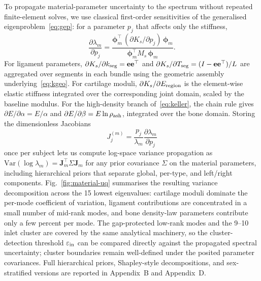 \documentclass[11pt]{article}
\begin{document}
To propagate material-parameter uncertainty to the spectrum without repeated finite-element solves, we use classical first-order sensitivities of the generalised eigenproblem~\eqref{eq:gep}: for a parameter $p_j$ that affects only the stiffness,
\begin{equation}
\frac{\partial\lambda_m}{\partial p_j}
=\frac{\boldsymbol\phi_m^\top\,(\partial K_s/\partial p_j)\,\boldsymbol\phi_m}
{\boldsymbol\phi_m^\top M_s\,\boldsymbol\phi_m}.
\label{eq:ev-sensitivity}
\end{equation}
For ligament parameters, $\partial K_s/\partial k_{\rm seg}=\mathbf e\mathbf e^\top$ and $\partial K_s/\partial T_{\rm seg}=(I-\mathbf e\mathbf e^\top)/L$ are aggregated over segments in each bundle using the geometric assembly underlying~\eqref{eq:kgeo}.
For cartilage moduli, $\partial K_s/\partial E_{\rm region}$ is the element-wise elastic stiffness integrated over the corresponding joint domain, scaled by the baseline modulus.
For the high-density branch of~\eqref{eq:keller}, the chain rule gives $\partial E/\partial\alpha=E/\alpha$ and $\partial E/\partial\beta=E\ln\rho_{\rm ash}$, integrated over the bone domain.
Storing the dimensionless Jacobians
\begin{equation}
J_j^{(m)}=\frac{p_j}{\lambda_m}\frac{\partial\lambda_m}{\partial p_j}
\end{equation}
once per subject lets us compute log-space variance propagation as $\mathrm{Var}(\log\lambda_m)=\mathbf J_m^\top\Sigma\mathbf J_m$ for any prior covariance $\Sigma$ on the material parameters, including hierarchical priors that separate global, per-type, and left/right components.
Fig.~\ref{fig:material-uq} summarises the resulting variance decomposition across the 15 lowest eigenvalues: cartilage moduli dominate the per-mode coefficient of variation, ligament contributions are concentrated in a small number of mid-rank modes, and bone density-law parameters contribute only a few percent per mode.
The gap-protected low-rank modes and the 9--10 inlet cluster are covered by the same analytical machinery, so the cluster-detection threshold $\varepsilon_{\rm in}$ can be compared directly against the propagated spectral uncertainty; cluster boundaries remain well-defined under the posited parameter covariances.
Full hierarchical priors, Shapley-style decompositions, and sex-stratified versions are reported in Appendix~B and Appendix~D.
\end{document}
